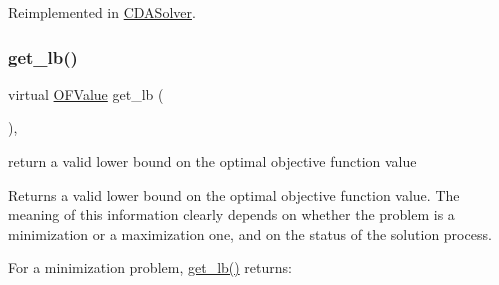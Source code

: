Reimplemented in \mbox{\hyperlink{class_s_m_spp__di__unipi__it_1_1_c_d_a_solver_a75dd1491b74c4b9476755e061dce3e04}{C\+D\+A\+Solver}}.

\mbox{\label{class_s_m_spp__di__unipi__it_1_1_solver_a4a4dbe4c2416d531c4619ca94fc07d31}} 
\subsubsection{\texorpdfstring{get\+\_\+lb()}{get\_lb()}}
{\footnotesize\ttfamily virtual \mbox{\hyperlink{class_s_m_spp__di__unipi__it_1_1_solver_ab8ce6bff9c21fdcd41e355167209301a}{O\+F\+Value}} get\+\_\+lb (\begin{DoxyParamCaption}\item[{void}]{ }\end{DoxyParamCaption})\hspace{0.3cm}{\ttfamily [inline]}, {\ttfamily [virtual]}}



return a valid lower bound on the optimal objective function value 

Returns a valid lower bound on the optimal objective function value. The meaning of this information clearly depends on whether the problem is a minimization or a maximization one, and on the status of the solution process.

For a minimization problem, \mbox{\hyperlink{class_s_m_spp__di__unipi__it_1_1_solver_a4a4dbe4c2416d531c4619ca94fc07d31}{get\+\_\+lb()}} returns\+:


